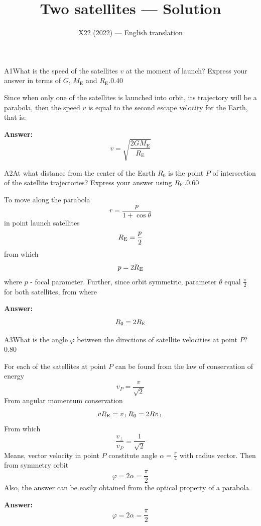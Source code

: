 \documentclass[11pt,a4paper]{article}
\title{\textbf{Two satellites --- Solution}}
\author{\normalsize X22 (2022) — English translation}
\date{}
\begin{document}
\maketitle\vspace{-0.5em}
\begin{solcard}{A1}{What is the speed of the satellites $v$ at the moment of launch? Express your answer in terms of $G$, $M_\text{E}$ and $R_\text{E}$.}{0.40}

Since when only one of the satellites is launched into orbit, its trajectory will be a parabola, then the speed $v$ is equal to the second escape velocity for the Earth, that is:

\par\smallskip\noindent\textbf{Answer:} \[ v = \sqrt{\frac{2GM_\text{E}}{R_\text{E}}} \]
\end{solcard}

\begin{solcard}{A2}{At what distance from the center of the Earth $R_0$ is the point $P$ of intersection of the satellite trajectories? Express your answer using $R_\text{\text{E}}$.}{0.60}

To move along the parabola $$r=\frac{p}{1+\cos\theta} $$ in point launch satellites $$R_\text{\text{E}}=\frac{p}{2} $$ from which $$p=2R_{\text{\text{E}}} $$ where $p$ - focal parameter. Further,  since orbit symmetric, parameter $\theta$ equal $\frac{\pi}{2}$ for both satellites, from where

\par\smallskip\noindent\textbf{Answer:} $$R_0=2R_\text{\text{E}} $$
\end{solcard}

\begin{solcard}{A3}{What is the angle $\varphi$ between the directions of satellite velocities at point $P$?}{0.80}

For each of the satellites at point $P$ can be found from the law of conservation of energy $$v_P=\frac{v}{\sqrt{2}} $$ From angular momentum conservation $$vR_\text{\text{E}}={v_\perp}R_0=2Rv_\perp $$ From which $$\frac{v_\perp}{v_P}=\frac{1}{\sqrt{2}} $$ Means, vector velocity in point $P$ constitute angle $\alpha=\frac{\pi}{4}$ with radius vector. Then from symmetry orbit $$\varphi=2\alpha=\frac{\pi}{2} $$ Also, the answer can be easily obtained from the optical property of a parabola.

\par\smallskip\noindent\textbf{Answer:} $$\varphi=2\alpha=\frac{\pi}{2} $$
\end{solcard}
\end{document}

